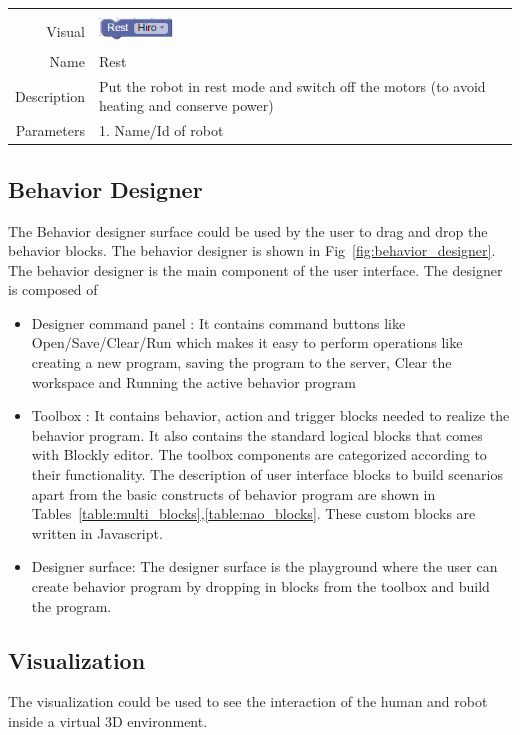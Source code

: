 \begin{table}
\begin{tabular}{|r|p{12cm}|}
    \hline
    {} & {} \\
                             Visual & \parbox[c]{1em}{\includegraphics[width=2cm]{../thesis/assets/blocks/nao_rest.png}} \\
                             Name   & Rest \\
                             Description & Put the robot in rest mode and switch off the motors (to avoid heating and conserve power)  \\
                             Parameters & 1. Name/Id of robot \\
     
    \hline
\end{tabular}
\end{table}
\subsection*{Behavior Designer} The Behavior designer surface could be used by the user to drag and drop the behavior blocks. The behavior designer is shown in Fig~\ref{fig:behavior_designer}.
The behavior designer is the main component of the user interface. The designer is composed of 
\begin{itemize}
\item Designer command panel : It contains command buttons like Open/Save/Clear/Run which makes it easy to perform operations like creating a new program, saving the program to the server, Clear the workspace and Running the active behavior program
\item Toolbox : It contains behavior, action and trigger blocks needed to realize the behavior program. It also contains the standard logical blocks that comes with Blockly editor. The toolbox components are categorized according to their functionality. The description of user interface blocks to build scenarios apart from the basic constructs of behavior program are shown in Tables~\ref{table:multi_blocks},\ref{table:nao_blocks}. These custom blocks are written in Javascript.
\item Designer surface: The designer surface is the playground where the user can create behavior program by dropping in blocks from the toolbox and build the program.
\end{itemize}
\subsection*{Visualization} The visualization could be used to see the interaction of the human and robot inside a virtual 3D environment.
